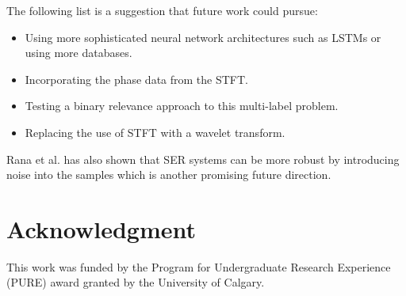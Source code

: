 \documentclass[conference]{IEEEtran}
\begin{document}
The following list is a suggestion that future work could pursue:
\begin{itemize}
	\item Using more sophisticated neural network architectures such as LSTMs or using more databases.
	\item Incorporating the phase data from the STFT.
	\item Testing a binary relevance approach to this multi-label problem.
	\item Replacing the use of STFT with a wavelet transform.
\end{itemize}
Rana et al. \cite{Rana2016} has also shown that SER systems can be more robust by introducing noise into the samples which is another promising future direction.

\section*{Acknowledgment}
This work was funded by the Program for Undergraduate Research Experience (PURE) award granted by the University of Calgary.



\end{document}
